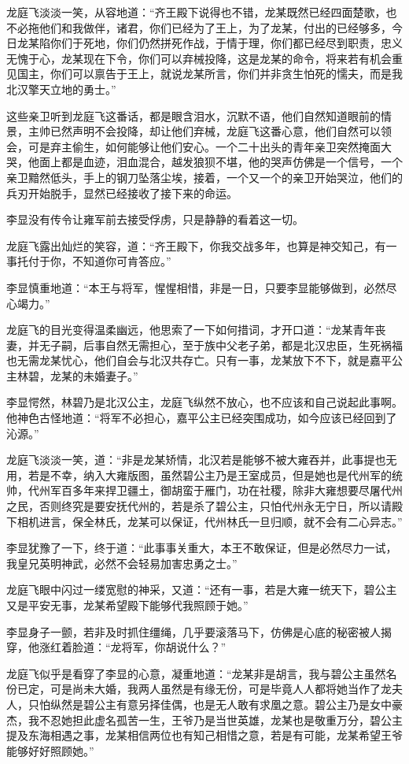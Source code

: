 龙庭飞淡淡一笑，从容地道：“齐王殿下说得也不错，龙某既然已经四面楚歌，也不必拖他们和我做伴，诸君，你们已经为了王上，为了龙某，付出的已经够多，今日龙某陷你们于死地，你们仍然拼死作战，于情于理，你们都已经尽到职责，忠义无愧于心，龙某现在下令，你们可以弃械投降，这是龙某的命令，将来若有机会重见国主，你们可以禀告于王上，就说龙某所言，你们并非贪生怕死的懦夫，而是我北汉擎天立地的勇士。”

这些亲卫听到龙庭飞这番话，都是眼含泪水，沉默不语，他们自然知道眼前的情景，主帅已然声明不会投降，却让他们弃械，龙庭飞这番心意，他们自然可以领会，可是弃主偷生，如何能够让他们安心。一个二十出头的青年亲卫突然掩面大哭，他面上都是血迹，泪血混合，越发狼狈不堪，他的哭声仿佛是一个信号，一个亲卫黯然低头，手上的钢刀坠落尘埃，接着，一个又一个的亲卫开始哭泣，他们的兵刃开始脱手，显然已经接收了接下来的命运。

李显没有传令让雍军前去接受俘虏，只是静静的看着这一切。

龙庭飞露出灿烂的笑容，道：“齐王殿下，你我交战多年，也算是神交知己，有一事托付于你，不知道你可肯答应。”

李显慎重地道：“本王与将军，惺惺相惜，非是一日，只要李显能够做到，必然尽心竭力。”

龙庭飞的目光变得温柔幽远，他思索了一下如何措词，才开口道：“龙某青年丧妻，并无子嗣，后事自然无需担心，至于族中父老子弟，都是北汉忠臣，生死祸福也无需龙某忧心，他们自会与北汉共存亡。只有一事，龙某放下不下，就是嘉平公主林碧，龙某的未婚妻子。”

李显愕然，林碧乃是北汉公主，龙庭飞纵然不放心，也不应该和自己说起此事啊。他神色古怪地道：“将军不必担心，嘉平公主已经突围成功，如今应该已经回到了沁源。”

龙庭飞淡淡一笑，道：“非是龙某矫情，北汉若是能够不被大雍吞并，此事提也无用，若是不幸，纳入大雍版图，虽然碧公主乃是王室成员，但是她也是代州军的统帅，代州军百多年来捍卫疆土，御胡蛮于雁门，功在社稷，除非大雍想要尽屠代州之民，否则终究是要安抚代州的，若是杀了碧公主，只怕代州永无宁日，所以请殿下相机进言，保全林氏，龙某可以保证，代州林氏一旦归顺，就不会有二心异志。”

李显犹豫了一下，终于道：“此事事关重大，本王不敢保证，但是必然尽力一试，我皇兄英明神武，必然不会轻易加害忠勇之士。”

龙庭飞眼中闪过一缕宽慰的神采，又道：“还有一事，若是大雍一统天下，碧公主又是平安无事，龙某希望殿下能够代我照顾于她。”

李显身子一颤，若非及时抓住缰绳，几乎要滚落马下，仿佛是心底的秘密被人揭穿，他涨红着脸道：“龙将军，你胡说什么？”

龙庭飞似乎是看穿了李显的心意，凝重地道：“龙某非是胡言，我与碧公主虽然名份已定，可是尚未大婚，我两人虽然是有缘无份，可是毕竟人人都将她当作了龙夫人，只怕纵然是碧公主有意另择佳偶，也是无人敢有求凰之意。碧公主乃是女中豪杰，我不忍她担此虚名孤苦一生，王爷乃是当世英雄，龙某也是敬重万分，碧公主提及东海相遇之事，龙某相信两位也有知己相惜之意，若是有可能，龙某希望王爷能够好好照顾她。”

